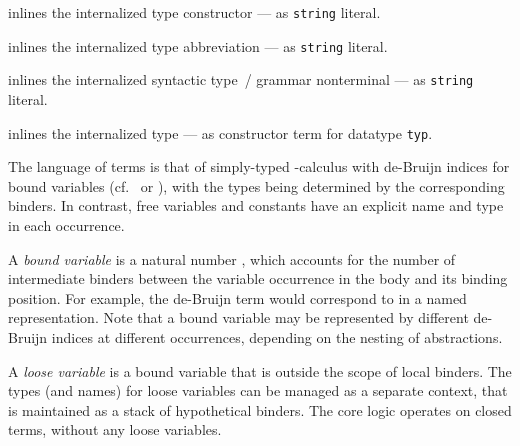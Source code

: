 \begin{isabellebody}
\begin{isamarkuptext}
\begin{description}
  \item {} inlines the internalized type
  constructor  --- as \verb|string| literal.

  \item {} inlines the internalized type
  abbreviation  --- as \verb|string| literal.

  \item {} inlines the internalized syntactic
  type~/ grammar nonterminal  --- as \verb|string|
  literal.

  \item {} inlines the internalized type \isa{{\isasymtau}}
  --- as constructor term for datatype \verb|typ|.

  \end{description}%
\end{isamarkuptext}%
\isamarkuptrue%
%
\endisatagmlantiq
{\isafoldmlantiq}%
%
\isadelimmlantiq
%
\endisadelimmlantiq
%
\isamarkuptrue%
%
\begin{isamarkuptext}%
The language of terms is that of simply-typed \isa{{\isasymlambda}}-calculus
  with de-Bruijn indices for bound variables (cf.\ \cite{debruijn72}
  or \cite{paulson-ml2}), with the types being determined by the
  corresponding binders.  In contrast, free variables and constants
  have an explicit name and type in each occurrence.

  \medskip A \emph{bound variable} is a natural number ,
  which accounts for the number of intermediate binders between the
  variable occurrence in the body and its binding position.  For
  example, the de-Bruijn term  would
  correspond to  in a named
  representation.  Note that a bound variable may be represented by
  different de-Bruijn indices at different occurrences, depending on
  the nesting of abstractions.

  A \emph{loose variable} is a bound variable that is outside the
  scope of local binders.  The types (and names) for loose variables
  can be managed as a separate context, that is maintained as a stack
  of hypothetical binders.  The core logic operates on closed terms,
  without any loose variables.


\end{isamarkuptext}
\end{isabellebody}
